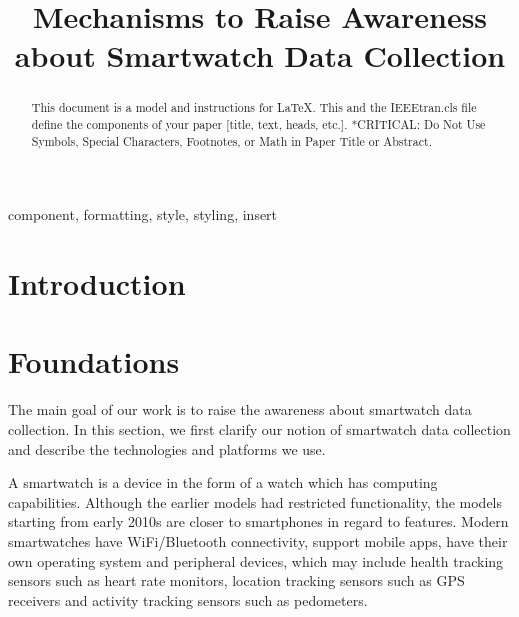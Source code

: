 \documentclass[conference, a4paper, 10pt, twocolumn]{IEEEtran}
\begin{document}
\title{Mechanisms to Raise Awareness about Smartwatch Data Collection}

\author{
	\and
}

\maketitle
\thispagestyle{plain}
\pagestyle{plain}


\begin{abstract}
This document is a model and instructions for \LaTeX.
This and the IEEEtran.cls file define the components of your paper [title, text, heads, etc.]. *CRITICAL: Do Not Use Symbols, Special Characters, Footnotes, 
or Math in Paper Title or Abstract.
\end{abstract}

\begin{IEEEkeywords}
component, formatting, style, styling, insert
\end{IEEEkeywords}

\section{Introduction}

\section{Foundations}\label{foundations}

The main goal of our work is to raise the awareness about smartwatch data collection. In this section, we first clarify our notion of smartwatch data collection and describe the technologies and platforms we use. 

A smartwatch is a device in the form of a watch which has computing capabilities. Although the earlier models had restricted functionality, the models starting from early 2010s are closer to smartphones in regard to features. Modern smartwatches have WiFi/Bluetooth connectivity, support mobile apps, have their own operating system and peripheral devices, which may include health tracking sensors such as heart rate monitors, location tracking sensors such as GPS receivers and activity tracking sensors such as pedometers.\cite{smartwatch}
\end{document}
